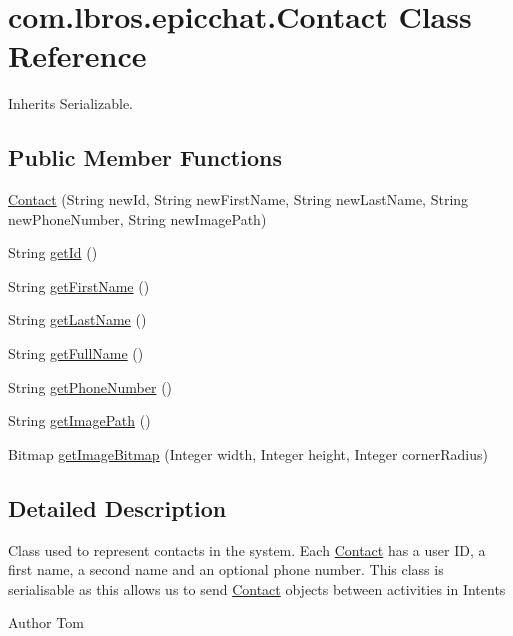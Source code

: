 \hypertarget{classcom_1_1lbros_1_1epicchat_1_1_contact}{\section{com.\-lbros.\-epicchat.\-Contact Class Reference}
\label{classcom_1_1lbros_1_1epicchat_1_1_contact}
}


Inherits Serializable.

\subsection*{Public Member Functions}
\begin{DoxyCompactItemize}
\item 
\hyperlink{classcom_1_1lbros_1_1epicchat_1_1_contact_ae8dc4ccd10a0c973b3b82ec90e18e851}{Contact} (String new\-Id, String new\-First\-Name, String new\-Last\-Name, String new\-Phone\-Number, String new\-Image\-Path)
\item 
String \hyperlink{classcom_1_1lbros_1_1epicchat_1_1_contact_a371d42b33ec31cc58205934c7ae0275c}{get\-Id} ()
\item 
String \hyperlink{classcom_1_1lbros_1_1epicchat_1_1_contact_a9e54f6f1a9258731b749bf73a5c624c4}{get\-First\-Name} ()
\item 
String \hyperlink{classcom_1_1lbros_1_1epicchat_1_1_contact_a013fd5e20c4b49ea772c0791340b6640}{get\-Last\-Name} ()
\item 
String \hyperlink{classcom_1_1lbros_1_1epicchat_1_1_contact_aee8c0516c4e425bcafda564667854b9f}{get\-Full\-Name} ()
\item 
String \hyperlink{classcom_1_1lbros_1_1epicchat_1_1_contact_af02151efe98b88fd67603ec34cd7c93a}{get\-Phone\-Number} ()
\item 
String \hyperlink{classcom_1_1lbros_1_1epicchat_1_1_contact_aaa22893e593650a5820b6bb292755b74}{get\-Image\-Path} ()
\item 
Bitmap \hyperlink{classcom_1_1lbros_1_1epicchat_1_1_contact_a40a9f98d02f8e130599b0b1fcb92f138}{get\-Image\-Bitmap} (Integer width, Integer height, Integer corner\-Radius)
\end{DoxyCompactItemize}


\subsection{Detailed Description}
Class used to represent contacts in the system. Each \hyperlink{classcom_1_1lbros_1_1epicchat_1_1_contact}{Contact} has a user I\-D, a first name, a second name and an optional phone number. This class is serialisable as this allows us to send \hyperlink{classcom_1_1lbros_1_1epicchat_1_1_contact}{Contact} objects between activities in Intents \begin{DoxyAuthor}{Author}
Tom 
\end{DoxyAuthor}


